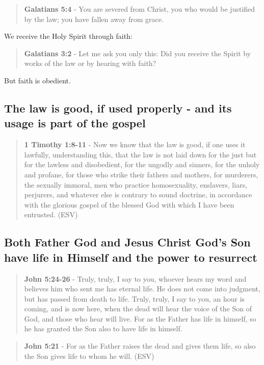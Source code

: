 \documentclass[11pt]{article}
\begin{document}
\begin{quote}
\textbf{Galatians 5:4} - You are severed from Christ, you who would be justified by the law; you have fallen away from grace.
\end{quote}

We receive the Holy Spirit through faith:

\begin{quote}
\textbf{Galatians 3:2} - Let me ask you only this: Did you receive the Spirit by works of the law or by hearing with faith?􄌹
\end{quote}

But faith is obedient.

\subsection{The law is good, if used properly - and its usage is part of the gospel}
\label{sec:orga6b3c5c}
\begin{quote}
\textbf{1 Timothy 1:8-11} - Now we know that the law is good, if one uses it lawfully, understanding this, that the law is not laid down for the just but for the lawless and disobedient, for the ungodly and sinners, for the unholy and profane, for those who strike their fathers and mothers, for murderers, the sexually immoral, men who practice homosexuality, enslavers, liars, perjurers, and whatever else is contrary to sound doctrine, in accordance with the glorious gospel of the blessed God with which I have been entrusted. (ESV)
\end{quote}

\subsection{Both Father God and Jesus Christ God's Son have life in Himself and the power to resurrect}
\label{sec:orgcc38d64}
\begin{quote}
\textbf{John 5:24-26} - Truly, truly, I say to you, whoever hears my word and believes him who sent me has eternal life. He does not come into judgment, but has passed from death to life. Truly, truly, I say to you, an hour is coming, and is now here, when the dead will hear the voice of the Son of God, and those who hear will live. For as the Father has life in himself, so he has granted the Son also to have life in himself.
\end{quote}

\begin{quote}
\textbf{John 5:21} - For as the Father raises the dead and gives them life, so also the Son gives life to whom he will. (ESV)
\end{quote}
\end{document}

